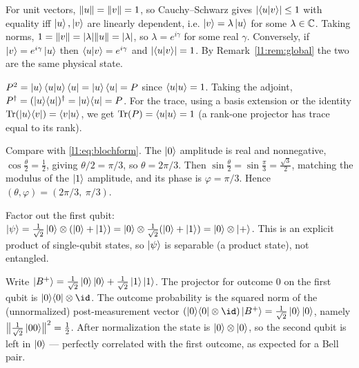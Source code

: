 \begin{solution}
For unit vectors, $\lVert u\rVert=\lVert v\rVert=1$, so Cauchy--Schwarz gives
$\lvert\braket{u|v}\rvert\le1$ with equality iff $\ket{u},\ket{v}$ are linearly dependent,
i.e. $\ket{v}=\lambda\ket{u}$ for some $\lambda\in\mathbb{C}$. Taking norms,
$1=\lVert v\rVert=\lvert\lambda\rvert\lVert u\rVert=\lvert\lambda\rvert$, so $\lambda=e^{i\gamma}$ for some
real $\gamma$. Conversely, if $\ket{v}=e^{i\gamma}\ket{u}$ then
$\braket{u|v}=e^{i\gamma}$ and $\lvert\braket{u|v}\rvert=1$. By Remark~\ref{l1:rem:global} the
two are the same physical state.
\end{solution}

\begin{solution}
$P^{2}=\ket{u}\braket{u|u}\bra{u}=\ket{u}\bra{u}=P$ since $\braket{u|u}=1$. Taking the
adjoint, $P^{\dagger}=(\ket{u}\!\bra{u})^{\dagger}=\ket{u}\!\bra{u}=P$. For the trace,
using a basis extension or the identity $\operatorname{Tr}(\ket{u}\!\bra{v})=\braket{v|u}$, we get
$\operatorname{Tr}(P)=\braket{u|u}=1$ (a rank-one projector has trace equal to its rank).
\end{solution}

\begin{solution}
Compare with \eqref{l1:eq:blochform}. The $\ket{0}$ amplitude is real and nonnegative,
$\cos\tfrac{\theta}{2}=\tfrac12$, giving $\theta/2=\pi/3$, so $\theta=2\pi/3$. Then
$\sin\tfrac{\theta}{2}=\sin\tfrac{\pi}{3}=\tfrac{\sqrt3}{2}$, matching the modulus of
the $\ket{1}$ amplitude, and its phase is $\varphi=\pi/3$. Hence
$(\theta,\varphi)=(2\pi/3,\ \pi/3)$.
\end{solution}

\begin{solution}
Factor out the first qubit:
$\ket{\psi}=\tfrac{1}{\sqrt2}\ket{0}\otimes(\ket{0}+\ket{1})
=\ket{0}\otimes\tfrac{1}{\sqrt2}(\ket{0}+\ket{1})=\ket{0}\otimes\ket{+}$.
This is an explicit product of single-qubit states, so $\ket{\psi}$ is separable
(a product state), not entangled.
\end{solution}

\begin{solution}
Write $\ket{B^{+}}=\tfrac{1}{\sqrt2}\ket{0}\ket{0}+\tfrac{1}{\sqrt2}\ket{1}\ket{1}$.
The projector for outcome $0$ on the first qubit is $\ketbra{0}{0}\otimes\id$. The
outcome probability is the squared norm of the (unnormalized) post-measurement vector
$(\ketbra{0}{0}\otimes\id)\ket{B^{+}}=\tfrac{1}{\sqrt2}\ket{0}\ket{0}$, namely
$\bigl\|\tfrac{1}{\sqrt2}\ket{00}\bigr\|^{2}=\tfrac12$. After normalization the state
is $\ket{0}\otimes\ket{0}$, so the second qubit is left in $\ket{0}$ --- perfectly
correlated with the first outcome, as expected for a Bell pair.
\end{solution}
